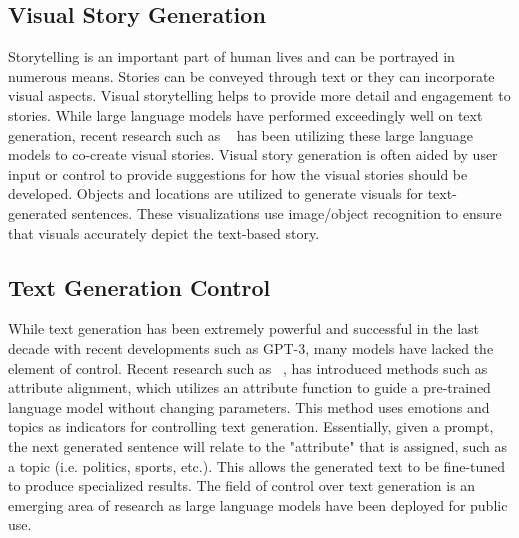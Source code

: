 \documentclass{article} %
\begin{document}
\subsection{Visual Story Generation}
Storytelling is an important part of human lives and can be portrayed in numerous means. Stories can be conveyed through text or they can incorporate visual aspects. Visual storytelling helps to provide more detail and engagement to stories. While large language models have performed exceedingly well on text generation, recent research such as ~\cite{Chen_Li_Shi_Liu_Si_2023} has been utilizing these large language models to co-create visual stories. Visual story generation is often aided by user input or control to provide suggestions for how the visual stories should be developed. Objects and locations are utilized to generate visuals for text-generated sentences. These visualizations use image/object recognition to ensure that visuals accurately depict the text-based story.

\subsection{Text Generation Control}
While text generation has been extremely powerful and successful in the last decade with recent developments such as GPT-3, many models have lacked the element of control. Recent research such as ~\cite{Yu_Yu_Sagae_2021}, has introduced methods such as attribute alignment, which utilizes an attribute function to guide a pre-trained language model without changing parameters. This method uses emotions and topics as indicators for controlling text generation. Essentially, given a prompt, the next generated sentence will relate to the "attribute" that is assigned, such as a topic (i.e. politics, sports, etc.). This allows the generated text to be fine-tuned to produce specialized results. The field of control over text generation is an emerging area of research as large language models have been deployed for public use.
\end{document}
